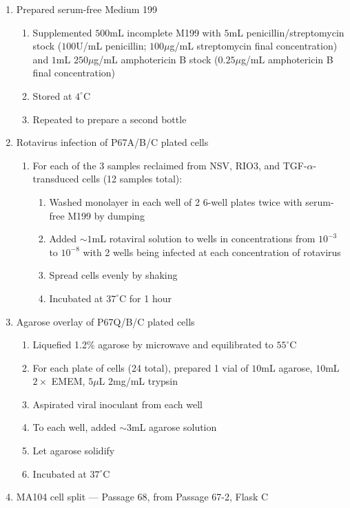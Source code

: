 \begin{enumerate}
	\item Prepared serum-free Medium 199
		\begin{enumerate}
			\item Supplemented $500$mL incomplete M199 with $5$mL penicillin/streptomycin stock ($100$U/mL penicillin; $100\mu$g/mL streptomycin final concentration) and $1$mL $250\mu$g/mL amphotericin B stock ($0.25\mu$g/mL amphotericin B final concentration)
			\item Stored at $4^{\circ}$C
			\item Repeated to prepare a second bottle
		\end{enumerate}
	\item Rotavirus infection of P67A/B/C plated cells
			\begin{enumerate}
				\item For each of the 3 samples reclaimed from NSV, RIO3, and TGF-$\alpha$-transduced cells (12 samples total):
					\begin{enumerate}
						\item Washed monolayer in each well of 2 6-well plates twice with serum-free M199 by dumping
						\item Added $\sim 1$mL rotaviral solution to wells in concentrations from $10^{-3}$ to $10^{-8}$ with 2 wells being infected at each concentration of rotavirus
						\item Spread cells evenly by shaking
						\item Incubated at $37^{\circ}$C for 1 hour
					\end{enumerate}
			\end{enumerate}
	\item Agarose overlay of P67Q/B/C plated cells
		\begin{enumerate}
			\item Liquefied 1.2\% agarose by microwave and equilibrated to $55^{\circ}$C
			\item For each plate of cells (24 total), prepared 1 vial of $10$mL agarose, $10$mL $2\times$ EMEM, $5\mu$L $2$mg/mL trypsin
			\item Aspirated viral inoculant from each well
			\item To each well, added $\sim3$mL agarose solution
			\item Let agarose solidify
			\item Incubated at $37^{\circ}$C
		\end{enumerate}
	\item MA104 cell split --- Passage 68, from Passage 67-2, Flask C

\end{enumerate}
